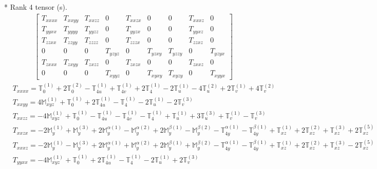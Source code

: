 \documentclass[fleqn,8pt,landscape]{jsarticle}
\begin{document}
* Rank 4 tensor (s).
\begin{align*}
\begin{bmatrix} T_{xxxx} & T_{xxyy} & T_{xxzz} & 0 & T_{xxzx} & 0 & 0 & T_{xxxz} & 0 \\ T_{yyxx} & T_{yyyy} & T_{yyzz} & 0 & T_{yyzx} & 0 & 0 & T_{yyxz} & 0 \\ T_{zzxx} & T_{zzyy} & T_{zzzz} & 0 & T_{zzzx} & 0 & 0 & T_{zzxz} & 0 \\ 0 & 0 & 0 & T_{yzyz} & 0 & T_{yzxy} & T_{yzzy} & 0 & T_{yzyx} \\ T_{zxxx} & T_{zxyy} & T_{zxzz} & 0 & T_{zxzx} & 0 & 0 & T_{zxxz} & 0 \\ 0 & 0 & 0 & T_{xyyz} & 0 & T_{xyxy} & T_{xyzy} & 0 & T_{xyyx} \end{bmatrix}
\end{align*}
\begin{align*}
& T_{xxxx} = \mathbb{T}_{0}^{(1)} + 2 \mathbb{T}_{0}^{(2)} - \mathbb{T}_{4u}^{(1)} + \mathbb{T}_{4v}^{(1)} + 2 \mathbb{T}_{4}^{(1)} - 2 \mathbb{T}_{u}^{(1)} - 4 \mathbb{T}_{u}^{(2)} + 2 \mathbb{T}_{v}^{(1)} + 4 \mathbb{T}_{v}^{(2)} \\
& T_{xxyy} = 4 \mathbb{M}_{xyz}^{(1)} + \mathbb{T}_{0}^{(1)} + 2 \mathbb{T}_{4u}^{(1)} - \mathbb{T}_{4}^{(1)} - 2 \mathbb{T}_{u}^{(1)} - 2 \mathbb{T}_{v}^{(3)} \\
& T_{xxzz} = - 4 \mathbb{M}_{xyz}^{(1)} + \mathbb{T}_{0}^{(1)} - \mathbb{T}_{4u}^{(1)} - \mathbb{T}_{4v}^{(1)} - \mathbb{T}_{4}^{(1)} + \mathbb{T}_{u}^{(1)} + 3 \mathbb{T}_{u}^{(3)} + \mathbb{T}_{v}^{(1)} - \mathbb{T}_{v}^{(3)} \\
& T_{xxzx} = - 2 \mathbb{M}_{y}^{(1)} + \mathbb{M}_{y}^{(3)} + 2 \mathbb{M}_{y}^{\alpha(1)} - \mathbb{M}_{y}^{\alpha(2)} + 2 \mathbb{M}_{y}^{\beta(1)} - \mathbb{M}_{y}^{\beta(2)} - \mathbb{T}_{4y}^{\alpha(1)} - \mathbb{T}_{4y}^{\beta(1)} + \mathbb{T}_{xz}^{(1)} + 2 \mathbb{T}_{xz}^{(2)} + \mathbb{T}_{xz}^{(3)} + 2 \mathbb{T}_{xz}^{(5)} \\
& T_{xxxz} = - 2 \mathbb{M}_{y}^{(1)} - \mathbb{M}_{y}^{(3)} + 2 \mathbb{M}_{y}^{\alpha(1)} + \mathbb{M}_{y}^{\alpha(2)} + 2 \mathbb{M}_{y}^{\beta(1)} + \mathbb{M}_{y}^{\beta(2)} - \mathbb{T}_{4y}^{\alpha(1)} - \mathbb{T}_{4y}^{\beta(1)} + \mathbb{T}_{xz}^{(1)} + 2 \mathbb{T}_{xz}^{(2)} + \mathbb{T}_{xz}^{(3)} - 2 \mathbb{T}_{xz}^{(5)} \\
& T_{yyxx} = - 4 \mathbb{M}_{xyz}^{(1)} + \mathbb{T}_{0}^{(1)} + 2 \mathbb{T}_{4u}^{(1)} - \mathbb{T}_{4}^{(1)} - 2 \mathbb{T}_{u}^{(1)} + 2 \mathbb{T}_{v}^{(3)} \\

\end{align*}
\end{document}
